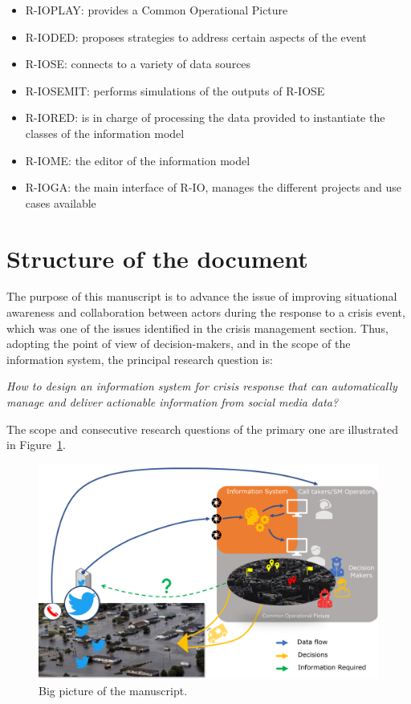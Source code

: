 \begin{itemize}
    \item R-IOPLAY: provides a Common Operational Picture
    \item R-IODED: proposes strategies to address certain aspects of the event
    \item R-IOSE: connects to a variety of data sources
    \item R-IOSEMIT: performs simulations of the outputs of R-IOSE
    \item R-IORED: is in charge of processing the data provided to instantiate the classes of the information model
    \item R-IOME: the editor of the information model
    \item R-IOGA: the main interface of R-IO, manages the different projects and use cases available
\end{itemize}

\section{Structure of the document}
The purpose of this manuscript is to advance the issue of improving situational awareness and collaboration between actors during the response to a crisis event, which was one of the issues identified in the crisis management section.
Thus, adopting the point of view of decision-makers, and in the scope of the information system, the principal research question is:

\emph{How to design an information system for crisis response that can automatically manage and deliver actionable information from social media data?}

The scope and consecutive research questions of the primary one are illustrated in Figure~\ref{context:big-picture}.

\begin{landscape}
    \begin{figure}[htb]
        \includegraphics[width=\textwidth,height=\paperheight,keepaspectratio]{figures/chap-1/big-picture.pdf}
        \caption{Big picture of the manuscript.}
        \label{context:big-picture}
    \end{figure}
\end{landscape}

